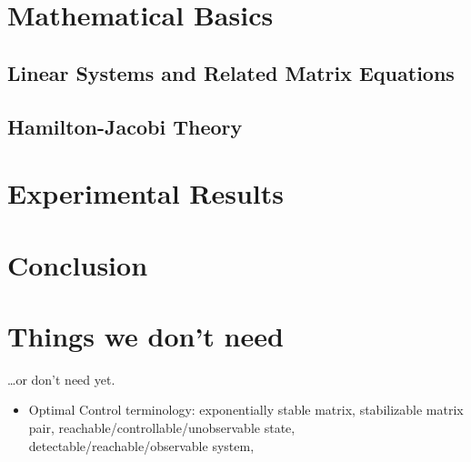 \documentclass[
  bibliography=totoc,
  listof=totoc,
  oneside,
]{scrbook}
\begin{document}
\frontmatter



\cleardoublepage
{}
\tableofcontents
\listoffigures

\cleardoublepage
{}
\listoftheorems

\listoftodos
\todototoc

\mainmatter


\chapter{Mathematical Basics}
\section{Linear Systems and Related Matrix Equations}
\section{Hamilton-Jacobi Theory}






\chapter{Experimental Results}
\chapter{Conclusion}

\appendix



\chapter{Things we don't need}

\dots or don't need yet.
\begin{itemize}
  \item
    Optimal Control terminology:
    exponentially stable matrix,
    stabilizable matrix pair,
    reachable/controllable/unobservable state,
    detectable/reachable/observable system,
    \etc
\end{itemize}

\backmatter
\glsaddallunused
\printglossaries
\printbibliography
\end{document}
